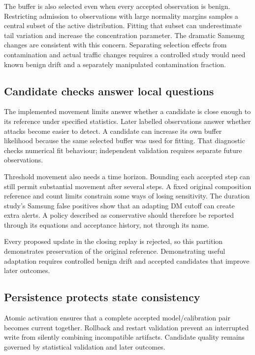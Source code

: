 The buffer is also selected even when every accepted observation is
benign. Restricting admission to observations with large normality
margins samples a central subset of the active distribution. Fitting
that subset can underestimate tail variation and increase the
concentration parameter. The dramatic Samsung changes are consistent
with this concern. Separating selection effects from contamination and
actual traffic changes requires a controlled
study would need known benign drift and a separately manipulated
contamination fraction.

\subsection{Candidate checks answer local questions}

The implemented movement limits answer whether a candidate is close
enough to its reference under specified statistics. Later labelled
observations answer whether attacks become easier to detect. A candidate can
increase its own buffer likelihood because the same selected buffer
was used for fitting. That diagnostic checks numerical fit behaviour;
independent validation requires separate future observations.

Threshold movement also needs a time horizon. Bounding each accepted
step can still permit substantial movement after several steps. A
fixed original composition reference and count limits constrain
some ways of losing sensitivity. The duration study's Samsung false
positives show that an adapting DM cutoff can create extra alerts.
A policy described as conservative should therefore be reported
through its equations and acceptance history, not through its name.

Every proposed update in the closing replay is rejected, so this partition
demonstrates preservation of the original reference. Demonstrating useful
adaptation requires controlled benign drift and accepted candidates that
improve later outcomes.

\subsection{Persistence protects state consistency}

Atomic activation ensures that a complete accepted model/calibration
pair becomes current together. Rollback and restart validation prevent
an interrupted write from silently combining incompatible artifacts.
Candidate quality remains governed by statistical validation and later
outcomes.

